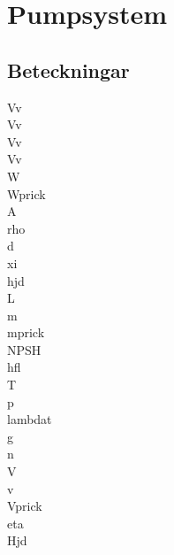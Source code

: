 \chapter{Pumpsystem}
\section*{Beteckningar}

\acrfull{Vv}\\
\acrfull{Vv}\\
\acrfull{Vv}\\
\acrfull{Vv}\\
\acrfull{W} \\
\acrfull{Wprick} \\
\acrfull{A} \\
\acrfull{rho} \\
\acrfull{d} \\
\acrfull{xi} \\
\acrfull{hjd} \\
\acrfull{L} \\
\acrfull{m} \\
\acrfull{mprick} \\
\acrfull{NPSH} \\
\acrfull{hfl} \\
\acrfull{T} \\
\acrfull{p} \\
\acrfull{lambdat} \\
\acrfull{g} \\
\acrfull{n} \\
\acrfull{V} \\
\acrfull{v} \\
\acrfull{Vprick} \\
\acrfull{eta} \\
\acrfull{Hjd}

